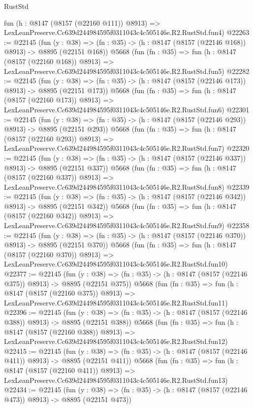 \begin{lexlean}{RustStd}
\begin{coremodule}
    fun (h : @8147 (@8157 (@22160 @111)) @8913) =>
    LexLeanPreserve.Cc639d244984595f0311043c4c505146e.R2.RustStd.fun4)
@22263 := @22145
    (fun (y : @38) => (fn : @35) -> (h : @8147 (@8157 (@22146 @168)) @8913) -> @8895 (@22151 @168))
    @5668
    (fun (fn : @35) =>
    fun (h : @8147 (@8157 (@22160 @168)) @8913) =>
    LexLeanPreserve.Cc639d244984595f0311043c4c505146e.R2.RustStd.fun5)
@22282 := @22145
    (fun (y : @38) => (fn : @35) -> (h : @8147 (@8157 (@22146 @173)) @8913) -> @8895 (@22151 @173))
    @5668
    (fun (fn : @35) =>
    fun (h : @8147 (@8157 (@22160 @173)) @8913) =>
    LexLeanPreserve.Cc639d244984595f0311043c4c505146e.R2.RustStd.fun6)
@22301 := @22145
    (fun (y : @38) => (fn : @35) -> (h : @8147 (@8157 (@22146 @293)) @8913) -> @8895 (@22151 @293))
    @5668
    (fun (fn : @35) =>
    fun (h : @8147 (@8157 (@22160 @293)) @8913) =>
    LexLeanPreserve.Cc639d244984595f0311043c4c505146e.R2.RustStd.fun7)
@22320 := @22145
    (fun (y : @38) => (fn : @35) -> (h : @8147 (@8157 (@22146 @337)) @8913) -> @8895 (@22151 @337))
    @5668
    (fun (fn : @35) =>
    fun (h : @8147 (@8157 (@22160 @337)) @8913) =>
    LexLeanPreserve.Cc639d244984595f0311043c4c505146e.R2.RustStd.fun8)
@22339 := @22145
    (fun (y : @38) => (fn : @35) -> (h : @8147 (@8157 (@22146 @342)) @8913) -> @8895 (@22151 @342))
    @5668
    (fun (fn : @35) =>
    fun (h : @8147 (@8157 (@22160 @342)) @8913) =>
    LexLeanPreserve.Cc639d244984595f0311043c4c505146e.R2.RustStd.fun9)
@22358 := @22145
    (fun (y : @38) => (fn : @35) -> (h : @8147 (@8157 (@22146 @370)) @8913) -> @8895 (@22151 @370))
    @5668
    (fun (fn : @35) =>
    fun (h : @8147 (@8157 (@22160 @370)) @8913) =>
    LexLeanPreserve.Cc639d244984595f0311043c4c505146e.R2.RustStd.fun10)
@22377 := @22145
    (fun (y : @38) => (fn : @35) -> (h : @8147 (@8157 (@22146 @375)) @8913) -> @8895 (@22151 @375))
    @5668
    (fun (fn : @35) =>
    fun (h : @8147 (@8157 (@22160 @375)) @8913) =>
    LexLeanPreserve.Cc639d244984595f0311043c4c505146e.R2.RustStd.fun11)
@22396 := @22145
    (fun (y : @38) => (fn : @35) -> (h : @8147 (@8157 (@22146 @388)) @8913) -> @8895 (@22151 @388))
    @5668
    (fun (fn : @35) =>
    fun (h : @8147 (@8157 (@22160 @388)) @8913) =>
    LexLeanPreserve.Cc639d244984595f0311043c4c505146e.R2.RustStd.fun12)
@22415 := @22145
    (fun (y : @38) => (fn : @35) -> (h : @8147 (@8157 (@22146 @411)) @8913) -> @8895 (@22151 @411))
    @5668
    (fun (fn : @35) =>
    fun (h : @8147 (@8157 (@22160 @411)) @8913) =>
    LexLeanPreserve.Cc639d244984595f0311043c4c505146e.R2.RustStd.fun13)
@22434 := @22145
    (fun (y : @38) => (fn : @35) -> (h : @8147 (@8157 (@22146 @473)) @8913) -> @8895 (@22151 @473))

\end{coremodule}
\end{lexlean}
